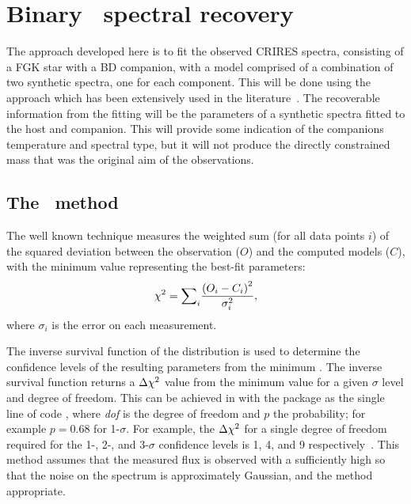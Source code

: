 

\section{Binary \texorpdfstring{\textchisquared}{chi-squared}\ spectral recovery}
\label{subsec:companion_recovery}
The approach developed here is to fit the observed CRIRES spectra, consisting of a {FGK} star with a {BD} companion, with a model comprised of a combination of two synthetic spectra, one for each component.
This will be done using the \textchisquared{} approach which has been extensively used in the literature~\citep[e.g.][to list a few]{astudillo-defru_harps_2015, passegger_fundamental_2016, passegger_carmenes_2018, zechmeister_spectrum_2018, nemravova_xtauri_2016, kolbl_detection_2015, rajpurohit_exploring_2018}.
The recoverable information from the fitting will be the parameters of a synthetic spectra fitted to the host and companion.
This will provide some indication of the companions temperature and spectral type, but it will not produce the directly constrained mass that was the original aim of the observations.

\subsection{The \texorpdfstring{\textchisquared{}}{chi-squared}\ method}
\label{subsec:chi2}

The well known \textchisquared{} technique measures the weighted sum (for all data points \(i\)) of the squared deviation between the observation (\({O}\)) and the computed models (\({C}\)), with the minimum \textchisquared{} value representing the best-fit parameters:
\begin{equation}
{\chi}^{2}{} = {\sum}_i \frac{{(O_{i} - {C}_{i})}^2}{{\sigma}_{i}^{2}},
\end{equation}
where \({\sigma}_{i}\) is the error on each measurement.

The inverse survival function of the \textchisquared{} distribution is used to determine the confidence levels of the resulting parameters from the minimum \textchisquared{}.
The inverse survival function returns a \(\Delta{\chi}^{2}\) value from the minimum \textchisquared{} value for a given $\sigma$ level and degree of freedom.
This can be achieved in \Python{} with the \scipy{} package as the single line of code , where \textit{dof} is the degree of freedom and \(p\) the probability; for example \(p = 0.68\) for 1-\(\sigma\).
For example, the \(\Delta {\chi}^{2}\) for a single degree of freedom required for the 1-, 2-, and 3-\(\sigma\) confidence levels is 1, 4, and 9 respectively~\citep{bevington_data_2003}.
This method assumes that the measured flux is observed with a \snr{} sufficiently high so that the noise on the spectrum is approximately Gaussian, and the \textchisquared{} method appropriate.

